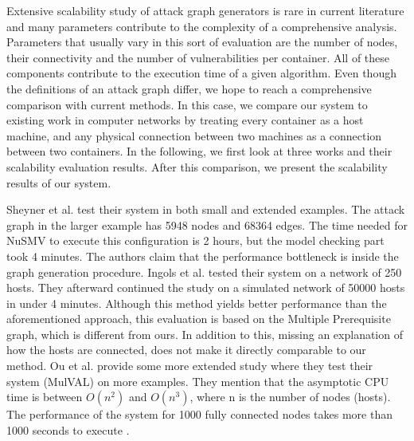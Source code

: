 Extensive scalability study of attack graph generators is rare in current literature and many parameters contribute to the complexity of a comprehensive analysis. Parameters that usually vary in this sort of evaluation are the number of nodes, their connectivity and the number of vulnerabilities per container. All of these components contribute to the execution time of a given algorithm. Even though the definitions of an attack graph differ, we hope to reach a comprehensive comparison with current methods. In this case, we compare our system to existing work in computer networks by treating every container as a host machine, and any physical connection between two machines as a connection between two containers. In the following, we first look at three works and their scalability evaluation results. After this comparison, we present the scalability results of our system.

Sheyner et al. \cite{sheyner2002automated} test their system in both small and extended examples. The attack graph in the larger example has 5948 nodes and 68364 edges. The time needed for NuSMV to execute this configuration is 2 hours, but the model checking part took 4 minutes. The authors claim that the performance bottleneck is inside the graph generation procedure. Ingols et al. \cite{ingols2006practical} tested their system on a network of 250 hosts. They afterward continued the study on a simulated network of 50000 hosts in under 4 minutes. Although this method yields better performance than the aforementioned approach, this evaluation is based on the Multiple Prerequisite graph, which is different from ours. In addition to this, missing an explanation of how the hosts are connected, does not make it directly comparable to our method. Ou et al. \cite{ou2006scalable} provide some more extended study where they test their system (MulVAL) on more examples. They mention that the asymptotic CPU time is between $O(n^2)$ and $O(n^3)$, where n is the number of nodes (hosts). The performance of the system for 1000 fully connected nodes takes more than 1000 seconds to execute . %


